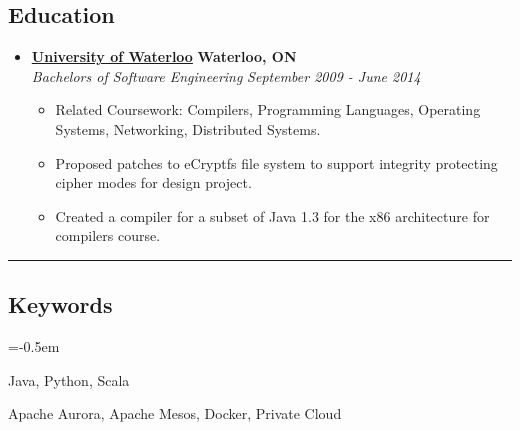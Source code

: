 \documentclass[10pt,letterpaper]{article}
\begin{document}
\subsection*{Education}
  \begin{itemize}
    \parskip=-0.5em

    \item[]
    {\href{http://www.uwaterloo.ca}{\textbf{University of Waterloo}} \hfill
      \textbf{Waterloo, ON}}
    \\
    {\emph{Bachelors of Software Engineering} \hfill
      \emph{September 2009 - June 2014}}

    \begin{itemize}[label=\textbullet]
      \item Related Coursework: Compilers, Programming Languages, Operating
        Systems, Networking, Distributed Systems.
      \item Proposed patches to eCryptfs file system to support
        integrity protecting cipher modes for design project.
      \item Created a compiler for a subset of Java 1.3 for the
        x86 architecture for compilers course.
    \end{itemize}
  \end{itemize}

\hrule
\vspace{-1.0em}
\subsection*{Keywords}
\begin{description}[labelindent=\parindent]
  \parskip=-0.5em
  \item[Languages:] Java, Python, Scala
  \item[Systems:] Apache Aurora, Apache Mesos, Docker, Private Cloud
\end{description}
\end{document}
